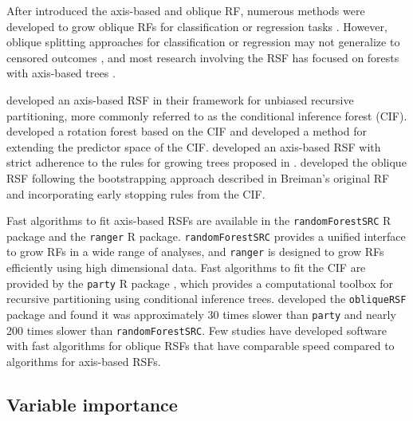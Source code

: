 \documentclass[12pt]{article}\usepackage[]{graphicx}\usepackage[]{xcolor}
\newcommand{\eg}{\textit{e.g.}}
\begin{document}
After \citet{breiman2001random} introduced the axis-based and oblique RF, numerous methods were developed to grow oblique RFs for classification or regression tasks \citep{menze2011oblique, zhang2014oblique, rainforth2015canonical, zhu2015reinforcement, poona2016investigating, qiu2017oblique, tomita2020sparse, katuwal2020heterogeneous}. However, oblique splitting approaches for classification or regression may not generalize to censored outcomes \citep[\eg, see][Section~4.5.1]{zhu2013tree}, and most research involving the RSF has focused on forests with axis-based trees \citep{wang2017selective}.

\citet{hothorn2006unbiased} developed an axis-based RSF in their framework for unbiased recursive partitioning, more commonly referred to as the conditional inference forest (CIF). \citet{zhou2016random} developed a rotation forest based on the CIF and \citet{wang2017random} developed a method for extending the predictor space of the CIF. \citet{ishwaran2008random} developed an axis-based RSF with strict adherence to the rules for growing trees proposed in \citet{breiman2001random}.  \citet{jaeger2019oblique} developed the oblique RSF following the bootstrapping approach described in Breiman's original RF and incorporating early stopping rules from the CIF.

Fast algorithms to fit axis-based RSFs are available in the \texttt{randomForestSRC} R package \citep{randomForestSRC} and the \texttt{ranger} \citep{ranger} R package. \texttt{randomForestSRC} provides a unified interface to grow RFs in a wide range of analyses, and \texttt{ranger} is designed to grow RFs efficiently using high dimensional data. Fast algorithms to fit the CIF are provided by the \texttt{party} R package \citep{hothorn2010party}, which provides a computational toolbox for recursive partitioning using conditional inference trees. \citet{jaeger2019oblique} developed the \texttt{obliqueRSF} package and found it was approximately 30 times slower than \texttt{party} and nearly 200 times slower than \texttt{randomForestSRC}. Few studies have developed software with fast algorithms for oblique RSFs that have comparable speed compared to algorithms for axis-based RSFs.

\subsection{Variable importance} \label{sec:rw_vi}
\end{document}
